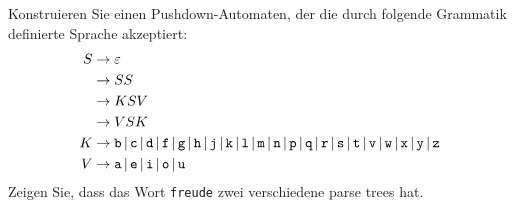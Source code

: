Konstruieren Sie einen Pushdown-Automaten, der die durch folgende
Grammatik definierte Sprache akzeptiert:
\begin{align*}
S&\rightarrow \varepsilon\\
 &\rightarrow SS\\
 &\rightarrow KSV\\
 &\rightarrow VSK\\
K&\rightarrow 
\text{\tt b}\,|\,
\text{\tt c}\,|\,
\text{\tt d}\,|\,
\text{\tt f}\,|\,
\text{\tt g}\,|\,
\text{\tt h}\,|\,
\text{\tt j}\,|\,
\text{\tt k}\,|\,
\text{\tt l}\,|\,
\text{\tt m}\,|\,
\text{\tt n}\,|\,
\text{\tt p}\,|\,
\text{\tt q}\,|\,
\text{\tt r}\,|\,
\text{\tt s}\,|\,
\text{\tt t}\,|\,
\text{\tt v}\,|\,
\text{\tt w}\,|\,
\text{\tt x}\,|\,
\text{\tt y}\,|\,
\text{\tt z}
\\
V&\rightarrow
\text{\tt a}\,|\,
\text{\tt e}\,|\,
\text{\tt i}\,|\,
\text{\tt o}\,|\,
\text{\tt u}
\end{align*}
Zeigen Sie, dass das Wort {\tt freude} zwei verschiedene
parse trees hat.


